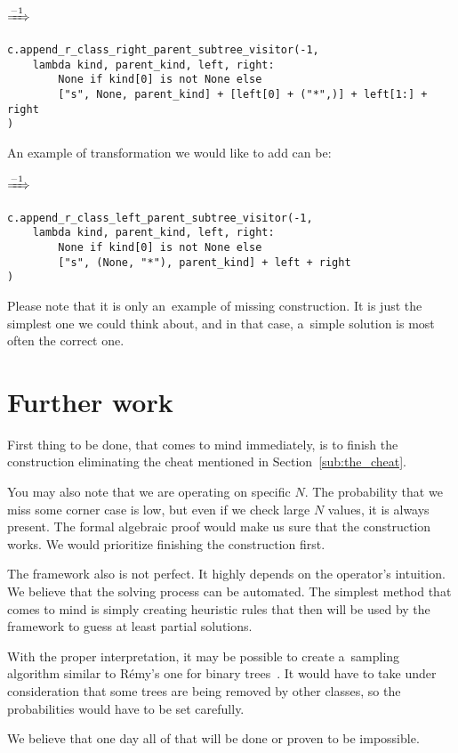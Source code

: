 \documentclass[final]{article}
\theoremstyle{definition}
\theoremstyle{definition}
\theoremstyle{remark}
\newcommand{\includeinlinescaledsvg}[3]{\begin{minipage}{#1\textwidth}\begin{center}\end{center}\end{minipage}}
\begin{document}
\begin{center}
    \includeinlinescaledsvg{.4}{.7}{lambda__transformations__013a}%
    \(\xRightarrow{-1}\)%
    \includeinlinescaledsvg{.4}{.7}{lambda__transformations__013b}%
\end{center}

\begin{lstlisting}
c.append_r_class_right_parent_subtree_visitor(-1,
    lambda kind, parent_kind, left, right:
        None if kind[0] is not None else
        ["s", None, parent_kind] + [left[0] + ("*",)] + left[1:] + right
)
\end{lstlisting}

An example of transformation we would like to add can be:

\begin{center}
    \includeinlinescaledsvg{.4}{.7}{lambda__transformations__014a}%
    \(\xRightarrow{-1}\)%
    \includeinlinescaledsvg{.4}{.7}{lambda__transformations__014b}%
\end{center}

\begin{lstlisting}
c.append_r_class_left_parent_subtree_visitor(-1,
    lambda kind, parent_kind, left, right:
        None if kind[0] is not None else
        ["s", (None, "*"), parent_kind] + left + right
)
\end{lstlisting}

Please note that it is only an~example of missing construction. It is just the simplest one we could think about, and in that case, a~simple solution is most often the correct one.

\section{Further work}%
\label{sec:further_work}

First thing to be done, that comes to mind immediately, is to finish the construction eliminating the cheat mentioned in Section~\ref{sub:the_cheat}.

You may also note that we are operating on specific \(N\). The probability that we miss some corner case is low, but even if we check large \(N\) values, it is always present. The formal algebraic proof would make us sure that the construction works. We would prioritize finishing the construction first.

The framework also is not perfect. It highly depends on the operator's intuition. We believe that the solving process can be automated. The simplest method that comes to mind is simply creating heuristic rules that then will be used by the framework to guess at least partial solutions.

With the proper interpretation, it may be possible to create a~sampling algorithm similar to Rémy's one for binary trees~\cite{remy,note}. It would have to take under consideration that some trees are being removed by other classes, so the probabilities would have to be set carefully.

We believe that one day all of that will be done or proven to be impossible.

\clearpage

\printbibliography%
\end{document}
